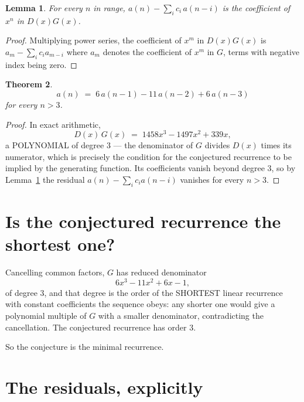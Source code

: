\documentclass[11pt,a4paper]{article}
\theoremstyle{plain}
\newtheorem{theorem}{Theorem}
\newtheorem{lemma}[theorem]{Lemma}
\theoremstyle{definition}
\begin{document}
\begin{lemma}\label{lem:key}
For every $n$ in range, $a(n)-\sum_i c_i\,a(n-i)$ is the coefficient of $x^{n}$ in
$D(x)G(x)$.
\end{lemma}

\begin{proof}
Multiplying power series, the coefficient of $x^{m}$ in $D(x)G(x)$ is
$a_m-\sum_i c_i a_{m-i}$ where $a_m$ denotes the coefficient of $x^{m}$ in $G$, terms with
negative index being zero.
\end{proof}

\begin{theorem}
\[
a(n)\;=\;6\,a(n-1) - 11\,a(n-2) + 6\,a(n-3)
\]
for every $n>3$.
\end{theorem}

\begin{proof}
In exact arithmetic,
\[
D(x)\,G(x)\;=\;1458 x^{3} - 1497 x^{2} + 339 x,
\]
a POLYNOMIAL of degree $3$ --- the denominator of $G$ divides $D(x)$ times its numerator,
which is precisely the condition for the conjectured recurrence to be implied by the
generating function. Its coefficients vanish beyond degree $3$, so by
Lemma~\ref{lem:key} the residual $a(n)-\sum_ic_ia(n-i)$ vanishes for every
$n>3$.
\end{proof}

\section{Is the conjectured recurrence the shortest one?}

Cancelling common factors, $G$ has reduced denominator
\[
6 x^{3} - 11 x^{2} + 6 x - 1,
\]
of degree $3$, and that degree is the order of the SHORTEST linear recurrence with
constant coefficients the sequence obeys: any shorter one would give a polynomial multiple of
$G$ with a smaller denominator, contradicting the cancellation. The conjectured recurrence has
order $3$.

So the conjecture is the minimal recurrence.

\section{The residuals, explicitly}
\end{document}
